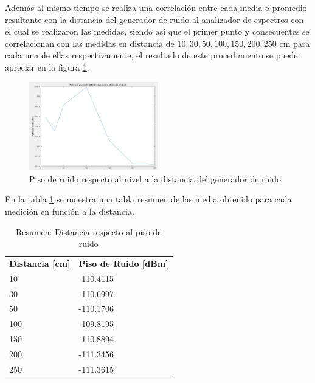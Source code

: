 \documentclass[conference]{IEEEtran}
\begin{document}
	Además al mismo tiempo se realiza una correlación entre cada media o promedio resultante con la distancia del generador de ruido al analizador de espectros con el cual se realizaron las medidas, siendo así que el primer punto y consecuentes se correlacionan con las medidas en distancia de $10, 30, 50, 100, 150, 200, 250$ cm para cada una de ellas respectivamente, el resultado de este procedimiento se puede apreciar en la figura \ref{fig:potencia-distancia}.
	
	\begin{figure}[h]
		\centering
		\includegraphics[width=0.5\textwidth]{media/potencia-distancia}
		\caption{Piso de ruido respecto al nivel a la distancia del generador de ruido}
		\label{fig:potencia-distancia}
	\end{figure}
	
	En la tabla \ref{tab:resumen-piso-ruido} se muestra una tabla resumen de las media obtenido para cada medición en función a la distancia.
	
	\begin{table}
		\centering
		\begin{tabular}{ll}
			\textbf{Distancia {[}cm{]}} & \textbf{Piso de Ruido {[}dBm{]}} \\
			10                          & -110.4115                        \\
			30                          & -110.6997                        \\
			50                          & -110.1706                        \\
			100                         & -109.8195                        \\
			150                         & -110.8894                        \\
			200                         & -111.3456                        \\
			250                         & -111.3615                       
		\end{tabular}
		\caption{Resumen: Distancia respecto al piso de ruido}
		\label{tab:resumen-piso-ruido}
	\end{table}
	
\end{document}
